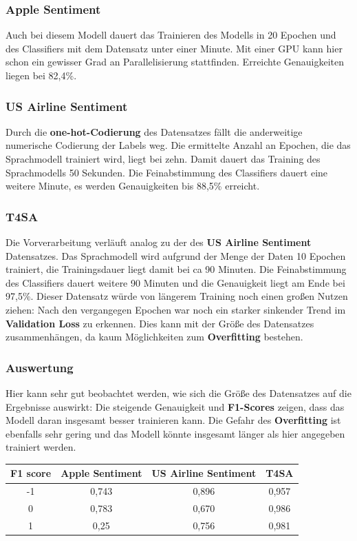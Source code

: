 \subsubsection*{Apple Sentiment}
Auch bei diesem Modell dauert das Trainieren des Modells in 20 Epochen und des Classifiers mit dem Datensatz unter einer Minute. Mit einer GPU kann hier schon ein gewisser Grad an Parallelisierung stattfinden.  Erreichte Genauigkeiten liegen bei 82,4\%. 


\subsubsection*{US Airline Sentiment}
Durch die \textbf{one-hot-Codierung} des Datensatzes f\"allt die anderweitige numerische Codierung der Labels weg. Die ermittelte Anzahl an Epochen, die das Sprachmodell trainiert wird, liegt bei zehn. Damit dauert das Training des Sprachmodells 50 Sekunden. Die Feinabstimmung des Classifiers dauert eine weitere Minute, es werden Genauigkeiten bis 88,5\% erreicht.

\subsubsection*{T4SA}
Die Vorverarbeitung verl\"auft analog zu der des \textbf{US Airline Sentiment} Datensatzes. Das Sprachmodell wird aufgrund der Menge der Daten 10 Epochen trainiert, die Trainingsdauer liegt damit bei ca 90 Minuten. Die Feinabstimmung des Classifiers dauert weitere 90 Minuten und die Genauigkeit liegt am Ende bei 97,5\%. Dieser Datensatz w\"urde von l\"angerem Training noch einen gro{\ss}en Nutzen ziehen: Nach den vergangegen Epochen war noch ein starker sinkender Trend im \textbf{Validation Loss}  zu erkennen. Dies kann mit der Gr\"o{\ss}e des Datensatzes zusammenh\"angen, da kaum M\"oglichkeiten zum \textbf{Overfitting} bestehen.

\subsubsection*{Auswertung}
Hier kann sehr gut beobachtet werden, wie sich die Gr\"o{\ss}e des Datensatzes auf die Ergebnisse auswirkt: Die steigende Genauigkeit und \textbf{F1-Scores} zeigen, dass das Modell daran insgesamt besser trainieren kann. Die Gefahr des \textbf{Overfitting} ist ebenfalls sehr gering und das Modell k\"onnte insgesamt l\"anger als hier angegeben trainiert werden.
\begin{center}
\begin{tabular}{|c||c|c|c|}
\hline
F1 score & Apple Sentiment & US Airline Sentiment & T4SA\\ 
\hline\hline
-1 & 0,743 & 0,896 & 0,957\\
\hline
0 & 0,783 & 0,670 & 0,986\\ 
\hline
1 & 0,25 & 0,756 &  0,981\\
\hline    
\end{tabular}
\end{center}

